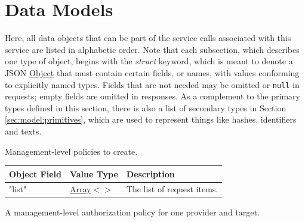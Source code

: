 \documentclass[a4paper]{arrowhead}
\newcommand{\mref}[2][]{{\textcolor{ArrowheadPurple}{\hyperref[sec:model:#2]{\ifstrempty{#1}{#2}{#1}}}}}
\newcommand{\pref}[1]{{\textcolor{ArrowheadGrey}{\hyperref[sec:model:primitives:#1]{#1}}}}
\begin{document}
\newpage

\section{Data Models}
\label{sec:model}

Here, all data objects that can be part of the service calls associated with this service are listed in alphabetic order.
Note that each subsection, which describes one type of object, begins with the \textit{struct} keyword, which is meant to denote a JSON \pref{Object} that must contain certain fields, or names, with values conforming to explicitly named types.
Fields that are not needed may be omitted or \texttt{null} in requests; empty fields are omitted in responses.
As a complement to the primary types defined in this section, there is also a list of secondary types in Section \ref{sec:model:primitives}, which are used to represent things like hashes, identifiers and texts.


Management-level policies to create.


\noindent\begin{tabularx}{\textwidth}{| >{\raggedright\arraybackslash}p{3.9cm} | >{\raggedright\arraybackslash\small}p{5.3cm} | X |} \hline
\rowcolor{gray!33} Object Field & Value Type & Description \\ \hline
"list" & \pref{Array}$<$\allowbreak{}\mref[Authorization\allowbreak{}Mgmt\allowbreak{}Grant\allowbreak{}Request]{AuthorizationMgmtGrantRequest}$>$ & The list of request items. \\ \hline
\end{tabularx}




A management-level authorization policy for one provider and target.
\end{document}
